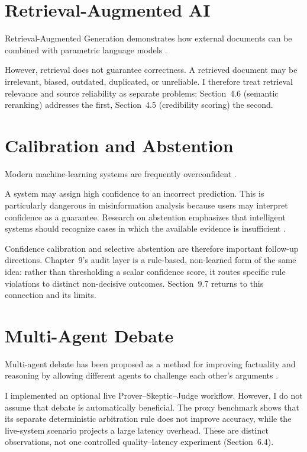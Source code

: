 \documentclass[12pt,a4paper,openany]{report}
\begin{document}
\section{Retrieval-Augmented AI}
Retrieval-Augmented Generation demonstrates how external documents can be combined with parametric language models \citep{lewis2020rag}.

However, retrieval does not guarantee correctness. A retrieved document may be irrelevant, biased, outdated, duplicated, or unreliable. I therefore treat retrieval relevance and source reliability as separate problems: Section~4.6 (semantic reranking) addresses the first, Section~4.5 (credibility scoring) the second.

\section{Calibration and Abstention}
Modern machine-learning systems are frequently overconfident \citep{guo2017calibration}.

A system may assign high confidence to an incorrect prediction. This is particularly dangerous in misinformation analysis because users may interpret confidence as a guarantee. Research on abstention emphasizes that intelligent systems should recognize cases in which the available evidence is insufficient \citep{wen2024abstention}.

Confidence calibration and selective abstention are therefore important follow-up directions. Chapter~9's audit layer is a rule-based, non-learned form of the same idea: rather than thresholding a scalar confidence score, it routes specific rule violations to distinct non-decisive outcomes. Section~9.7 returns to this connection and its limits.

\section{Multi-Agent Debate}
Multi-agent debate has been proposed as a method for improving factuality and reasoning by allowing different agents to challenge each other's arguments \citep{du2023debate}.

I implemented an optional live Prover--Skeptic--Judge workflow. However, I do not assume that debate is automatically beneficial. The proxy benchmark shows that its separate deterministic arbitration rule does not improve accuracy, while the live-system scenario projects a large latency overhead. These are distinct observations, not one controlled quality--latency experiment (Section~6.4).
\end{document}
